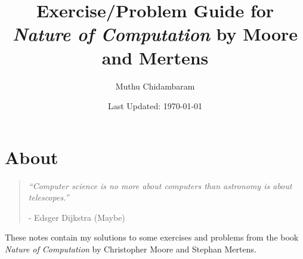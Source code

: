 \documentclass{article}
\begin{document}
\title{Exercise/Problem Guide for \textit{Nature of Computation} by Moore and Mertens}
\author{Muthu Chidambaram}
\date{Last Updated: \today}

\maketitle

\tableofcontents
\newpage 

\section*{About}

\begin{quote}
        \textit{``Computer science is no more about computers than astronomy is about telescopes.''} 
        
        - Edsger Dijkstra (Maybe)
\end{quote}

These notes contain my solutions to some exercises and problems from the book \textit{Nature of Computation} by
Christopher Moore and Stephan Mertens.







\end{document}
